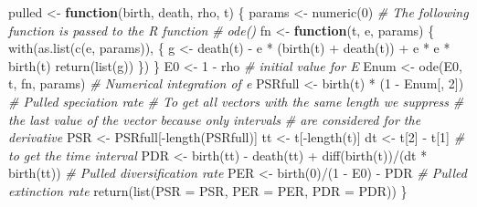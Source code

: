 \documentclass[
]{article}
\newenvironment{Shaded}{\begin{snugshade}}{\end{snugshade}}
\newcommand{\AttributeTok}[1]{\textcolor[rgb]{0.77,0.63,0.00}{#1}}
\newcommand{\CommentTok}[1]{\textcolor[rgb]{0.56,0.35,0.01}{\textit{#1}}}
\newcommand{\ControlFlowTok}[1]{\textcolor[rgb]{0.13,0.29,0.53}{\textbf{#1}}}
\newcommand{\DecValTok}[1]{\textcolor[rgb]{0.00,0.00,0.81}{#1}}
\newcommand{\FunctionTok}[1]{\textcolor[rgb]{0.00,0.00,0.00}{#1}}
\newcommand{\NormalTok}[1]{#1}
\newcommand{\OtherTok}[1]{\textcolor[rgb]{0.56,0.35,0.01}{#1}}
\newcommand{\SpecialCharTok}[1]{\textcolor[rgb]{0.00,0.00,0.00}{#1}}
\begin{document}
\begin{Shaded}
\begin{Highlighting}[]
\NormalTok{pulled }\OtherTok{\textless{}{-}} \ControlFlowTok{function}\NormalTok{(birth, death, rho, t) \{}
\NormalTok{    params }\OtherTok{\textless{}{-}} \FunctionTok{numeric}\NormalTok{(}\DecValTok{0}\NormalTok{)}
    \CommentTok{\# The following function is passed to the R function}
    \CommentTok{\# ode()}
\NormalTok{    fn }\OtherTok{\textless{}{-}} \ControlFlowTok{function}\NormalTok{(t, e, params) \{}
        \FunctionTok{with}\NormalTok{(}\FunctionTok{as.list}\NormalTok{(}\FunctionTok{c}\NormalTok{(e, params)), \{}
\NormalTok{            g }\OtherTok{\textless{}{-}} \FunctionTok{death}\NormalTok{(t) }\SpecialCharTok{{-}}\NormalTok{ e }\SpecialCharTok{*}\NormalTok{ (}\FunctionTok{birth}\NormalTok{(t) }\SpecialCharTok{+} \FunctionTok{death}\NormalTok{(t)) }\SpecialCharTok{+}\NormalTok{ e }\SpecialCharTok{*}\NormalTok{ e }\SpecialCharTok{*}
                \FunctionTok{birth}\NormalTok{(t)}
            \FunctionTok{return}\NormalTok{(}\FunctionTok{list}\NormalTok{(g))}
\NormalTok{        \})}
\NormalTok{    \}}
\NormalTok{    E0 }\OtherTok{\textless{}{-}} \DecValTok{1} \SpecialCharTok{{-}}\NormalTok{ rho  }\CommentTok{\# initial value for E}
\NormalTok{    Enum }\OtherTok{\textless{}{-}} \FunctionTok{ode}\NormalTok{(E0, t, fn, params)  }\CommentTok{\# Numerical integration of e}
\NormalTok{    PSRfull }\OtherTok{\textless{}{-}} \FunctionTok{birth}\NormalTok{(t) }\SpecialCharTok{*}\NormalTok{ (}\DecValTok{1} \SpecialCharTok{{-}}\NormalTok{ Enum[, }\DecValTok{2}\NormalTok{])  }\CommentTok{\# Pulled speciation rate}
    \CommentTok{\# To get all vectors with the same length we suppress}
    \CommentTok{\# the last value of the vector because only intervals}
    \CommentTok{\# are considered for the derivative}
\NormalTok{    PSR }\OtherTok{\textless{}{-}}\NormalTok{ PSRfull[}\SpecialCharTok{{-}}\FunctionTok{length}\NormalTok{(PSRfull)]}
\NormalTok{    tt }\OtherTok{\textless{}{-}}\NormalTok{ t[}\SpecialCharTok{{-}}\FunctionTok{length}\NormalTok{(t)]}
\NormalTok{    dt }\OtherTok{\textless{}{-}}\NormalTok{ t[}\DecValTok{2}\NormalTok{] }\SpecialCharTok{{-}}\NormalTok{ t[}\DecValTok{1}\NormalTok{]  }\CommentTok{\# to get the time interval}
\NormalTok{    PDR }\OtherTok{\textless{}{-}} \FunctionTok{birth}\NormalTok{(tt) }\SpecialCharTok{{-}} \FunctionTok{death}\NormalTok{(tt) }\SpecialCharTok{+} \FunctionTok{diff}\NormalTok{(}\FunctionTok{birth}\NormalTok{(t))}\SpecialCharTok{/}\NormalTok{(dt }\SpecialCharTok{*} \FunctionTok{birth}\NormalTok{(tt))  }\CommentTok{\# Pulled diversification rate}
\NormalTok{    PER }\OtherTok{\textless{}{-}} \FunctionTok{birth}\NormalTok{(}\DecValTok{0}\NormalTok{)}\SpecialCharTok{/}\NormalTok{(}\DecValTok{1} \SpecialCharTok{{-}}\NormalTok{ E0) }\SpecialCharTok{{-}}\NormalTok{ PDR  }\CommentTok{\# Pulled extinction rate}
    \FunctionTok{return}\NormalTok{(}\FunctionTok{list}\NormalTok{(}\AttributeTok{PSR =}\NormalTok{ PSR, }\AttributeTok{PER =}\NormalTok{ PER, }\AttributeTok{PDR =}\NormalTok{ PDR))}
\NormalTok{\}}
\end{Highlighting}
\end{Shaded}
\end{document}
